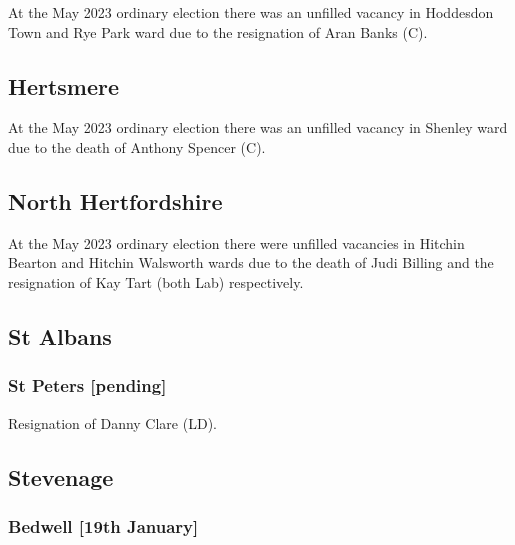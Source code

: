 \documentclass[a4paper,openany]{book}
\begin{document}
\begin{resultsiii}
At the May 2023 ordinary election there was an unfilled vacancy in Hoddesdon Town and Rye Park ward due to the resignation of Aran Banks (C).%

\subsection*{Hertsmere}

At the May 2023 ordinary election there was an unfilled vacancy in Shenley ward due to the death of Anthony Spencer (C).%

\subsection*{North Hertfordshire}

At the May 2023 ordinary election there were unfilled vacancies in Hitchin Bearton and Hitchin Walsworth wards due to the death of Judi Billing and the resignation of Kay Tart (both Lab) respectively.%
%

\subsection*{St Albans}

\subsubsection*{St Peters \hspace*{\fill}\nolinebreak[1]%
	\enspace\hspace*{\fill}
	[pending]}


Resignation of Danny Clare (LD).

\subsection*{Stevenage}

\subsubsection*{Bedwell \hspace*{\fill}\nolinebreak[1]%
	\enspace\hspace*{\fill}
	[19th January]}


\end{resultsiii}
\end{document}
